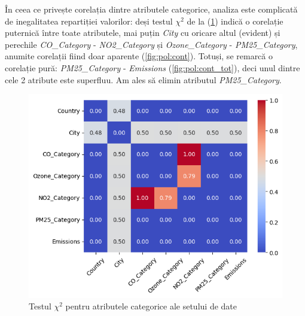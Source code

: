 \documentclass{article}
\begin{document}
În ceea ce privește corelația dintre atributele categorice, analiza este 
complicată de inegalitatea repartiției valorilor: deși testul $\chi^2$ de la 
(\ref{fig:pol:chi2}) indică o corelație puternică între toate atributele, mai
puțin \textit{City} cu oricare altul (evident) și perechile 
\textit{CO\_Category} - \textit{NO2\_Category} și \textit{Ozone\_Category} - 
\textit{PM25\_Category}, anumite corelații fiind doar aparente 
(\ref{fig:pol:cont}). Totuși, se remarcă o corelație pură: 
\textit{PM25\_Category} - \textit{Emissions} (\ref{fig:pol:cont_tot}), deci unul
dintre cele 2 atribute este superfluu. Am ales să elimin atributul 
\textit{PM25\_Category}.

\begin{figure}[htb]
    \centering
    \includegraphics[scale=0.7]{air_pollution/analysis/correlation/chi2.png}
    \caption{Testul $\chi^2$ pentru atributele categorice ale setului de date}
    \label{fig:pol:chi2}
\end{figure}
\end{document}

